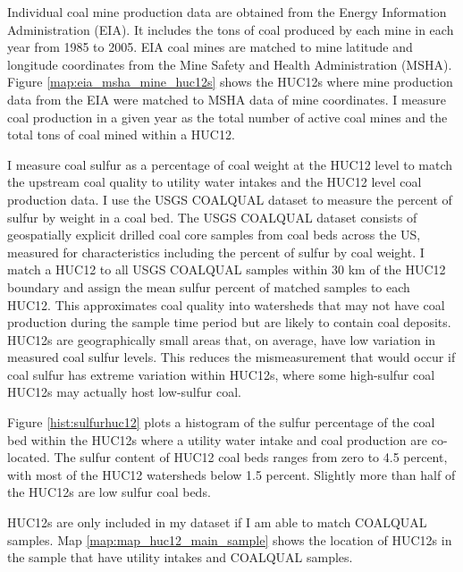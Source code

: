 \documentclass{article}
\begin{document}
Individual coal mine production data are obtained from the Energy Information Administration (EIA). It includes the tons of coal produced by each mine in each year from 1985 to 2005. EIA coal mines are matched to mine latitude and longitude coordinates from the Mine Safety and Health Administration (MSHA). Figure \ref{map:eia_msha_mine_huc12s} shows the HUC12s where mine production data from the EIA were matched to MSHA data of mine coordinates. I measure coal production in a given year as the total number of active coal mines and the total tons of coal mined within a HUC12.


I measure coal sulfur as a percentage of coal weight at the HUC12 level to match the upstream coal quality to utility water intakes and the HUC12 level coal production data. I use the USGS COALQUAL dataset to measure the percent of sulfur by weight in a coal bed. The USGS COALQUAL dataset consists of geospatially explicit drilled coal core samples from coal beds across the US, measured for characteristics including the percent of sulfur by coal weight. I match a HUC12 to all USGS COALQUAL samples within 30 km of the HUC12 boundary and assign the mean sulfur percent of matched samples to each HUC12. This approximates coal quality into watersheds that may not have coal production during the sample time period but are likely to contain coal deposits. HUC12s are geographically small areas that, on average, have low variation in measured coal sulfur levels. This reduces the mismeasurement that would occur if coal sulfur has extreme variation within HUC12s, where some high-sulfur coal HUC12s may actually host low-sulfur coal.

Figure \ref{hist:sulfurhuc12} plots a histogram of the sulfur percentage of the coal bed within the HUC12s where a utility water intake and coal production are co-located. The sulfur content of HUC12 coal beds ranges from zero to 4.5 percent, with most of the HUC12 watersheds below 1.5 percent. Slightly more than half of the HUC12s are low sulfur coal beds.

HUC12s are only included in my dataset if I am able to match COALQUAL samples. Map \ref{map:map_huc12_main_sample} shows the location of HUC12s in the sample that have utility intakes and COALQUAL samples.
\end{document}
